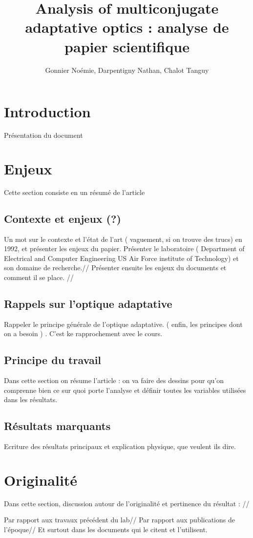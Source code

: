 \documentclass{article}
\begin{document}
\title{Analysis of multiconjugate adaptative optics : analyse de papier scientifique }
\author{Gonnier Noémie, Darpentigny Nathan, Chalot Tanguy}

\maketitle

\section{Introduction}
Présentation du document 

\section{Enjeux}

Cette section consiste en un résumé de l'article
\subsection{Contexte et enjeux (?)}

Un mot sur le contexte et l'état de l'art ( vaguement, si on trouve des trucs) en 1992, et présenter les enjeux du papier. Présenter le laboratoire ( Department of Electrical and Computer Engineering US Air Force institute of Technology) et son domaine de recherche.//
Présenter ensuite les enjeux du documents et comment il se place. //
\subsection{Rappels sur l'optique adaptative}
Rappeler le principe générale de l'optique adaptative. ( enfin, les principes dont on a besoin ) . C'est ke rapprochement avec le cours. 

\subsection{Principe du travail}

Dans cette section on résume l'article : on va faire des dessins pour qu'on comprenne bien ce sur quoi porte l'analyse et définir toutes les variables utilisées dans les résultats.

\subsection{Résultats marquants}

Ecriture des résultats principaux et explication physique, que veulent ils dire. 

\section{Originalité}
Dans cette section, discussion autour de l'originalité et pertinence du résultat : //

Par rapport aux travaux précédent du lab//
Par rapport aux publications de l'époque//
Et surtout dans les documents qui le citent et l'utilisent. 
\end{document}
